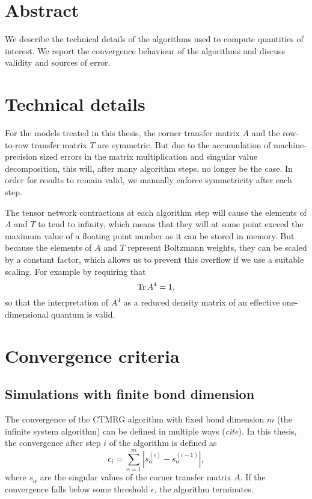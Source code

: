 \section{Abstract}

We describe the technical details of the algorithms used to compute quantities of interest.
We report the convergence behaviour of the algorithms and discuss validity and sources of error.

\section{Technical details}
For the models treated in this thesis, the corner transfer matrix $A$ and the row-to-row transfer matrix $T$ are
symmetric. But due to the accumulation of machine-precision sized errors in the matrix multiplication and singular value
decomposition, this will, after many algorithm steps, no longer be the case. In order for results to remain valid, we
manually enforce symmetricity after each step.

The tensor network contractions at each algorithm step will cause the elements of $A$ and $T$ to tend to infinity, which
means that they will at some point exceed the maximum value of a floating point number as it can be stored in memory.
But because the elements of $A$ and $T$ represent Boltzmann weights, they can be scaled by a constant factor, which
allows us to prevent this overflow if we use a suitable scaling. For example by requiring that
\begin{equation}
  \operatorname{Tr} A^4 = 1,
\end{equation}
so that the interpretation of $A^4$ as a reduced density matrix of an effective one-dimensional quantum is valid.

\section{Convergence criteria}

\subsection{Simulations with finite bond dimension}
The convergence of the CTMRG algorithm with fixed bond dimension $m$ (the infinite system algorithm) can be defined
in multiple ways (\emph{cite}). In this thesis, the convergence after step $i$ of the algorithm is defined as
\begin{equation}
  c_i = \sum_{\alpha = 1}^{m} | s_{\alpha}^{(i)} - s_{\alpha}^{(i - 1)} |,
\end{equation}
where $s_{\alpha}$ are the singular values of the corner transfer matrix $A$. If the convergence falls below some
threshold $\epsilon$, the algorithm terminates.

